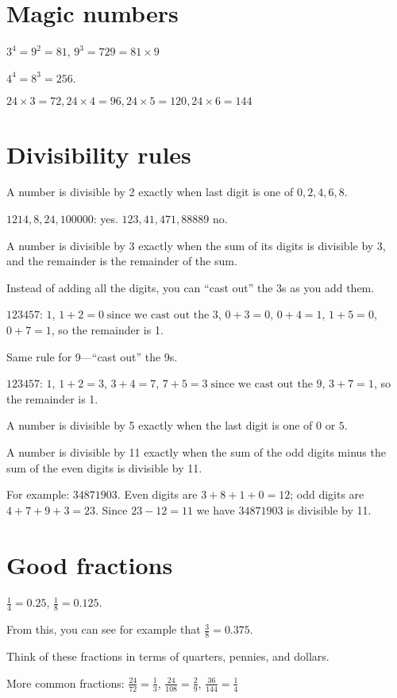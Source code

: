 \documentclass[fullpage,twocolumn]{article}
\begin{document}
\section{Magic numbers}
$3^4 = 9^2 = 81$, $9^3 = 729 = 81 \times 9$

$4^4 = 8^3 = 256$.

$24 \times 3 = 72, 24 \times 4 = 96, 24  \times 5 = 120, 24 \times 6 = 144$

\section{Divisibility rules}

A number is divisible by 2 exactly when last digit is one of $0,2,4,6,8$.

$1214, 8, 24, 100000$: yes. $123, 41, 471, 88889$ no.

A number is divisible by 3 exactly when the sum of its digits is divisible by
$3$, and the remainder is the remainder of the sum.

Instead of adding all the digits, you can ``cast out'' the 3s as you add them.

$123457$: $1$, $1+2=0 \; \mbox{since we cast out the 3}$, $0+3 = 0$,
$0+4 = 1$, $1+5 = 0$, $0+7=1$, so the remainder is 1.

Same rule for 9---``cast out'' the 9s.

$123457$: $1$, $1+2=3$, $3+4 = 7$,
$7+5 = 3 \; \mbox{since we cast out the 9}$,
$3+7=1$, so the remainder is 1.

A number is divisible by 5 exactly when the last digit is one of $0$ or $5$.

A number is divisible by 11 exactly when the sum of the odd digits minus the sum
of the even digits is divisible by 11.

For example: $34871903$. Even digits are $3+8+1+0=12$; odd
digits are $4+7+9+3=23$. Since $23-12=11$ we have $34871903$ is divisible by 11.


\section{Good fractions}

$\frac{1}{4} = 0.25$, $\frac{1}{8} = 0.125$.

From this, you can see for example that $\frac{3}{8} = 0.375$.

Think of these fractions in terms of quarters, pennies, and dollars.

More common fractions:
$\frac{24}{72} = \frac{1}{3}$, $\frac{24}{108} = \frac{2}{9}$, $\frac{36}{144} = \frac{1}{4}$
\end{document}
